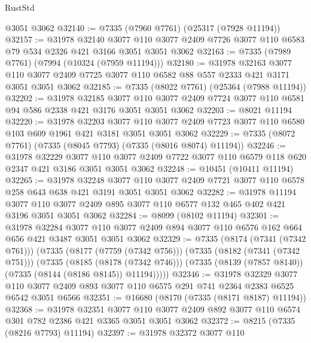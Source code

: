 \begin{lexlean}{RustStd}
\begin{coremodule}
    @3051
    @3062
@32140 := @7335 (@7960 @7761) (@25317 (@7928 @11194))
@32157 := @31978
    @32140
    @3077
    @110
    @3077
    @2409
    @7726
    @3077
    @110
    @6583
    @79
    @534
    @2326
    @421
    @3166
    @3051
    @3051
    @3062
@32163 := @7335 (@7989 @7761) (@7994 (@10324 (@7959 @11194)))
@32180 := @31978
    @32163
    @3077
    @110
    @3077
    @2409
    @7725
    @3077
    @110
    @6582
    @88
    @557
    @2333
    @421
    @3171
    @3051
    @3051
    @3062
@32185 := @7335 (@8022 @7761) (@25364 (@7988 @11194))
@32202 := @31978
    @32185
    @3077
    @110
    @3077
    @2409
    @7724
    @3077
    @110
    @6581
    @94
    @586
    @2338
    @421
    @3176
    @3051
    @3051
    @3062
@32203 := @8021 @11194
@32220 := @31978
    @32203
    @3077
    @110
    @3077
    @2409
    @7723
    @3077
    @110
    @6580
    @103
    @609
    @1961
    @421
    @3181
    @3051
    @3051
    @3062
@32229 := @7335 (@8072 @7761) (@7335 (@8045 @7793) (@7335 (@8016 @8074) @11194))
@32246 := @31978
    @32229
    @3077
    @110
    @3077
    @2409
    @7722
    @3077
    @110
    @6579
    @118
    @620
    @2347
    @421
    @3186
    @3051
    @3051
    @3062
@32248 := @10451 (@10411 @11194)
@32265 := @31978
    @32248
    @3077
    @110
    @3077
    @2409
    @7721
    @3077
    @110
    @6578
    @258
    @643
    @638
    @421
    @3191
    @3051
    @3051
    @3062
@32282 := @31978
    @11194
    @3077
    @110
    @3077
    @2409
    @895
    @3077
    @110
    @6577
    @132
    @465
    @402
    @421
    @3196
    @3051
    @3051
    @3062
@32284 := @8099 (@8102 @11194)
@32301 := @31978
    @32284
    @3077
    @110
    @3077
    @2409
    @894
    @3077
    @110
    @6576
    @162
    @664
    @656
    @421
    @3487
    @3051
    @3051
    @3062
@32329 := @7335
    (@8174 (@7341 (@7342 @761)))
    (@7335
      (@8177 (@7759 (@7342 @756)))
      (@7335
        (@8182 (@7341 (@7342 @751)))
        (@7335
          (@8185 (@8178 (@7342 @746)))
          (@7335 (@8139 (@7857 @8140)) (@7335 (@8144 (@8186 @8145)) @11194)))))
@32346 := @31978
    @32329
    @3077
    @110
    @3077
    @2409
    @893
    @3077
    @110
    @6575
    @291
    @741
    @2364
    @2383
    @6525
    @6542
    @3051
    @6566
@32351 := @16680 (@8170 (@7335 (@8171 @8187) @11194))
@32368 := @31978
    @32351
    @3077
    @110
    @3077
    @2409
    @892
    @3077
    @110
    @6574
    @301
    @782
    @2386
    @421
    @3365
    @3051
    @3051
    @3062
@32372 := @8215 (@7335 (@8216 @7793) @11194)
@32397 := @31978
    @32372
    @3077
    @110

\end{coremodule}
\end{lexlean}
